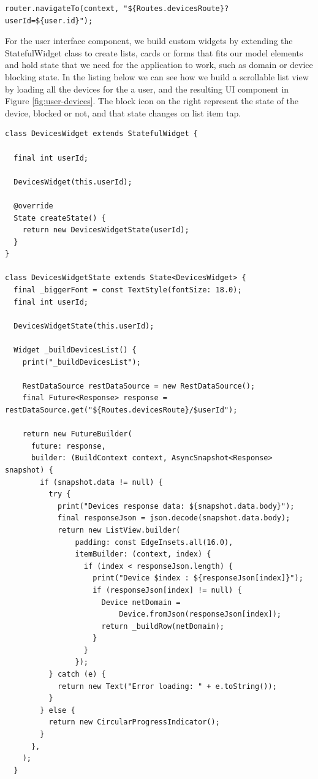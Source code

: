 \begin{lstlisting}
router.navigateTo(context, "${Routes.devicesRoute}?userId=${user.id}");
\end{lstlisting}

For the user interface component, we build custom widgets by extending the StatefulWidget class to create lists, cards or forms that fits our model elements and hold state that we need for the application to work, such as domain or device blocking state. In the listing below we can see how we build a scrollable list view by loading all the devices for the a user, and the resulting UI component in Figure \ref{fig:user-devices}. The block icon on the right represent the state of the device, blocked or not, and that state changes on list item tap.

\begin{lstlisting}
class DevicesWidget extends StatefulWidget {

  final int userId;

  DevicesWidget(this.userId);

  @override
  State createState() {
    return new DevicesWidgetState(userId);
  }
}

class DevicesWidgetState extends State<DevicesWidget> {
  final _biggerFont = const TextStyle(fontSize: 18.0);
  final int userId;

  DevicesWidgetState(this.userId);

  Widget _buildDevicesList() {
    print("_buildDevicesList");

    RestDataSource restDataSource = new RestDataSource();
    final Future<Response> response = restDataSource.get("${Routes.devicesRoute}/$userId");

    return new FutureBuilder(
      future: response,
      builder: (BuildContext context, AsyncSnapshot<Response> snapshot) {
        if (snapshot.data != null) {
          try {
            print("Devices response data: ${snapshot.data.body}");
            final responseJson = json.decode(snapshot.data.body);
            return new ListView.builder(
                padding: const EdgeInsets.all(16.0),
                itemBuilder: (context, index) {
                  if (index < responseJson.length) {
                    print("Device $index : ${responseJson[index]}");
                    if (responseJson[index] != null) {
                      Device netDomain =
                          Device.fromJson(responseJson[index]);
                      return _buildRow(netDomain);
                    }
                  }
                });
          } catch (e) {
            return new Text("Error loading: " + e.toString());
          }
        } else {
          return new CircularProgressIndicator();
        }
      },
    );
  }


\end{lstlisting}
